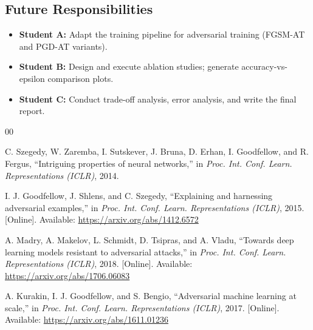 \documentclass[conference]{IEEEtran}
\begin{document}
\subsection*{Future Responsibilities}
\begin{itemize}
    \item \textbf{Student A:} Adapt the training pipeline for adversarial training (FGSM-AT and PGD-AT variants).
    \item \textbf{Student B:} Design and execute ablation studies; generate accuracy-vs-epsilon comparison plots.
    \item \textbf{Student C:} Conduct trade-off analysis, error analysis, and write the final report.
\end{itemize}


\begin{thebibliography}{00}

C. Szegedy, W. Zaremba, I. Sutskever, J. Bruna, D. Erhan, I. Goodfellow,
and R. Fergus,
``Intriguing properties of neural networks,''
in \textit{Proc. Int. Conf. Learn. Representations (ICLR)}, 2014.

I. J. Goodfellow, J. Shlens, and C. Szegedy,
``Explaining and harnessing adversarial examples,''
in \textit{Proc. Int. Conf. Learn. Representations (ICLR)}, 2015.
[Online]. Available: \url{https://arxiv.org/abs/1412.6572}

A. Madry, A. Makelov, L. Schmidt, D. Tsipras, and A. Vladu,
``Towards deep learning models resistant to adversarial attacks,''
in \textit{Proc. Int. Conf. Learn. Representations (ICLR)}, 2018.
[Online]. Available: \url{https://arxiv.org/abs/1706.06083}

A. Kurakin, I. J. Goodfellow, and S. Bengio,
``Adversarial machine learning at scale,''
in \textit{Proc. Int. Conf. Learn. Representations (ICLR)}, 2017.
[Online]. Available: \url{https://arxiv.org/abs/1611.01236}

\end{thebibliography}
\end{document}
